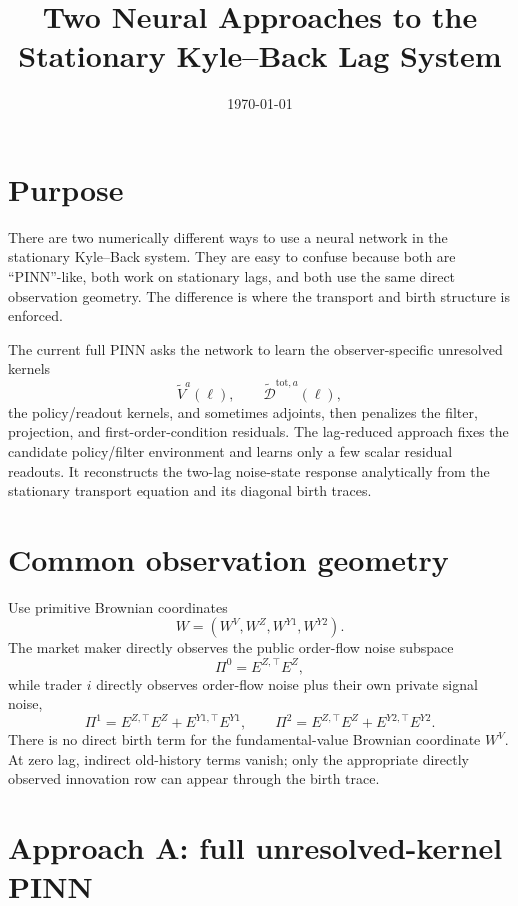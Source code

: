 \documentclass[11pt]{article}
\title{Two Neural Approaches to the Stationary Kyle--Back Lag System}
\author{}
\date{\today}
\newcommand{\Dt}{\widetilde{\mathcal D}}
\newcommand{\Vt}{\widetilde V}
\begin{document}
\maketitle

\section*{Purpose}

There are two numerically different ways to use a neural network in the
stationary Kyle--Back system.  They are easy to confuse because both are
``PINN''-like, both work on stationary lags, and both use the same direct
observation geometry.  The difference is where the transport and birth
structure is enforced.

The current full PINN asks the network to learn the observer-specific unresolved
kernels
\[
  \Vt^a(\ell), \qquad \Dt^{\mathrm{tot},a}(\ell),
\]
the policy/readout kernels, and sometimes adjoints, then penalizes the filter,
projection, and first-order-condition residuals.  The lag-reduced approach fixes
the candidate policy/filter environment and learns only a few scalar residual
readouts.  It reconstructs the two-lag noise-state response analytically from
the stationary transport equation and its diagonal birth traces.

\section*{Common observation geometry}

Use primitive Brownian coordinates
\[
  W=(W^V,W^Z,W^{Y1},W^{Y2}).
\]
The market maker directly observes the public order-flow noise subspace
\[
  \Pi^0=E^{Z,\top}E^Z,
\]
while trader \(i\) directly observes order-flow noise plus their own private
signal noise,
\[
  \Pi^1=E^{Z,\top}E^Z+E^{Y1,\top}E^{Y1},\qquad
  \Pi^2=E^{Z,\top}E^Z+E^{Y2,\top}E^{Y2}.
\]
There is no direct birth term for the fundamental-value Brownian coordinate
\(W^V\).  At zero lag, indirect old-history terms vanish; only the appropriate
directly observed innovation row can appear through the birth trace.

\section*{Approach A: full unresolved-kernel PINN}
\end{document}
